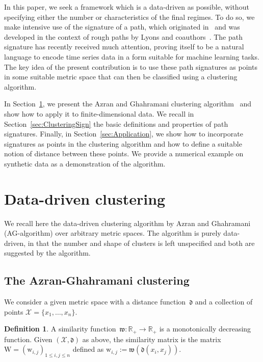 \documentclass{amsart}[11pt]
\numberwithin{equation}{section}
\theoremstyle{definition}
\newtheorem{definition}[theorem]{Definition}
\newcommand{\Xx}{\mathcal{X}}
\newcommand{\ww}{\mathrm{w}}
\newcommand{\RR}{\mathbb{R}}
\newcommand{\df}{\mathfrak{d}}
\newcommand{\wf}{\mathfrak{w}}
\newcommand{\Wf}{\mathrm{W}}
\begin{document}
In this paper, we seek a framework which is a data-driven as possible, without specifying either the number or characteristics of the final regimes.
To do so, we make intensive use of the signature of a path, which originated in~\cite{Chen58} and was developed in the context of rough paths by Lyons and coauthors~\cite{Boedihardjo, Lyons10, Lyons07, LyonsBook, LyonsInverting}.
The path signature has recently received much attention, proving itself to be a natural language to encode time series data in a form suitable for machine learning tasks. 
The key idea of the present contribution is to use these path signatures as
points in some suitable metric space that can then be classified using a clustering algorithm.

In Section~\ref{cha:clustering}, we present the Azran and Ghahramani clustering algorithm~\cite{Azran06} and show how to apply it to finite-dimensional data.
We recall in Section~\ref{sec:ClusteringSign} the basic definitions and properties of path signatures.
Finally, in Section~\ref{sec:Application}, we show how to incorporate signatures 
as points in the clustering algorithm and how to define a suitable notion of distance between these points.
We provide a numerical example on synthetic data as a demonstration of the algorithm.

\section{Data-driven clustering}\label{cha:clustering}

We recall here the data-driven clustering algorithm by Azran and Ghahramani~\cite{Azran06} (AG-algorithm) over arbitrary metric spaces.
The algorithm is purely data-driven, in that the number and shape of clusters is left unspecified and both are suggested by the algorithm.

\subsection{The Azran-Ghahramani clustering}

We consider a given metric space with a distance function~$\df$
and a collection of points $\Xx = \{x_1, \ldots, x_n\}$.

\begin{definition}
A similarity function~$\wf:\RR_+\to\RR_+$ is a monotonically decreasing function.
Given $(\Xx, \df)$ as above, the similarity matrix is the matrix $\Wf = (\ww_{i,j})_{1\leq i,j\leq n}$
defined as $\ww_{i,j}:=\wf(\df(x_i,x_j))$.
\end{definition}
\end{document}
